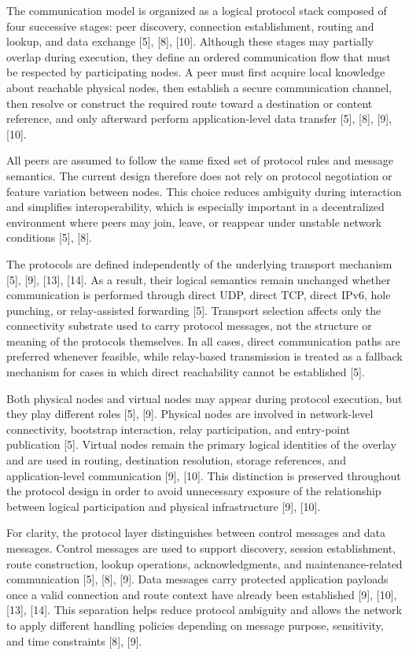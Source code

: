 \documentclass[12pt,a4paper]{article}
\begin{document}
The communication model is organized as a logical protocol stack composed of four successive stages: peer discovery, connection establishment, routing and lookup, and data exchange [5], [8], [10]. Although these stages may partially overlap during execution, they define an ordered communication flow that must be respected by participating nodes. A peer must first acquire local knowledge about reachable physical nodes, then establish a secure communication channel, then resolve or construct the required route toward a destination or content reference, and only afterward perform application-level data transfer [5], [8], [9], [10].

All peers are assumed to follow the same fixed set of protocol rules and message semantics. The current design therefore does not rely on protocol negotiation or feature variation between nodes. This choice reduces ambiguity during interaction and simplifies interoperability, which is especially important in a decentralized environment where peers may join, leave, or reappear under unstable network conditions [5], [8].

The protocols are defined independently of the underlying transport mechanism [5], [9], [13], [14]. As a result, their logical semantics remain unchanged whether communication is performed through direct UDP, direct TCP, direct IPv6, hole punching, or relay-assisted forwarding [5]. Transport selection affects only the connectivity substrate used to carry protocol messages, not the structure or meaning of the protocols themselves. In all cases, direct communication paths are preferred whenever feasible, while relay-based transmission is treated as a fallback mechanism for cases in which direct reachability cannot be established [5].

Both physical nodes and virtual nodes may appear during protocol execution, but they play different roles [5], [9]. Physical nodes are involved in network-level connectivity, bootstrap interaction, relay participation, and entry-point publication [5]. Virtual nodes remain the primary logical identities of the overlay and are used in routing, destination resolution, storage references, and application-level communication [9], [10]. This distinction is preserved throughout the protocol design in order to avoid unnecessary exposure of the relationship between logical participation and physical infrastructure [9], [10].

For clarity, the protocol layer distinguishes between control messages and data messages. Control messages are used to support discovery, session establishment, route construction, lookup operations, acknowledgments, and maintenance-related communication [5], [8], [9]. Data messages carry protected application payloads once a valid connection and route context have already been established [9], [10], [13], [14]. This separation helps reduce protocol ambiguity and allows the network to apply different handling policies depending on message purpose, sensitivity, and time constraints [8], [9].
\end{document}
